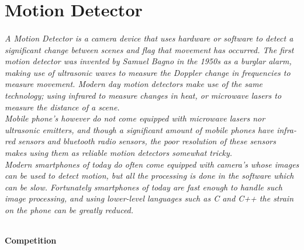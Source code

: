 %
%
%
%
%



\part{Motion Detector}
\paragraph{A Motion Detector is a camera device that uses hardware or software to detect a significant change between scenes and flag that movement has occurred. The first motion detector was invented by Samuel Bagno in the 1950s as a burglar alarm, making use of ultrasonic waves to measure the Doppler change in frequencies to measure movement. Modern day motion detectors make use of the same technology; using infrared to measure changes in heat, or microwave lasers to measure the distance of a scene.\\
Mobile phone's however do not come equipped with microwave lasers nor ultrasonic emitters, and though a significant amount of mobile phones have infra-red sensors and bluetooth radio sensors, the poor resolution of these sensors makes using them as reliable motion detectors somewhat tricky.\\
Modern smartphones of today do often come equipped with camera's whose images can be used to detect motion, but all the processing is done in the software which can be slow. Fortunately smartphones of today are fast enough to handle such image processing, and using lower-level languages such as C and C++ the strain on the phone can be greatly reduced.}

\subsection{Competition}
